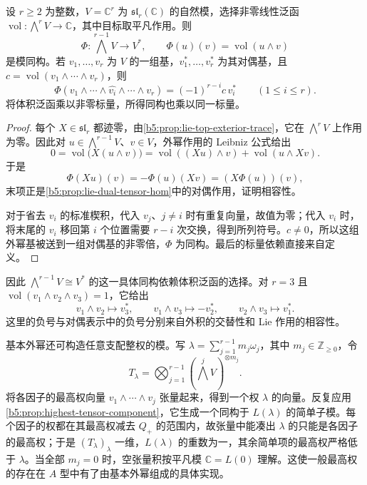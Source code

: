 \begin{proposition}[体积泛函与外幂对偶]\label{b5:prop:volume-exterior-dual}
	设 \(r\ge2\) 为整数，\(V=\mathbb C^r\) 为 \(\mathfrak{sl}_r(\mathbb C)\) 的自然模，选择非零线性泛函 \(\operatorname{vol}:\bigwedge^rV\to\mathbb C\)，其中目标取平凡作用。则
	\[
		\Phi:\bigwedge^{r-1}V\longrightarrow V^*,\qquad \Phi(u)(v)=\operatorname{vol}(u\wedge v)
	\]
	是模同构。若 \(v_1,\ldots,v_r\) 为 \(V\) 的一组基，\(v_1^*,\ldots,v_r^*\) 为其对偶基，且 \(c=\operatorname{vol}(v_1\wedge\cdots\wedge v_r)\)，则
	\[
		\Phi(v_1\wedge\cdots\wedge\widehat{v_i}\wedge\cdots\wedge v_r) =(-1)^{r-i}c\,v_i^*\qquad(1\le i\le r).
	\]
	将体积泛函乘以非零标量，所得同构也乘以同一标量。
\end{proposition}
\begin{proof}
	每个 \(X\in\mathfrak{sl}_r\) 都迹零，由\cref{b5:prop:lie-top-exterior-trace}，它在 \(\bigwedge^rV\) 上作用为零。因此对 \(u\in\bigwedge^{r-1}V\)、\(v\in V\)，外幂作用的 Leibniz 公式给出
	\[
		0=\operatorname{vol}\bigl(X(u\wedge v)\bigr) =\operatorname{vol}((Xu)\wedge v)+\operatorname{vol}(u\wedge Xv).
	\]
	于是
	\[
		\Phi(Xu)(v)=-\Phi(u)(Xv)=(X\Phi(u))(v),
	\]
	末项正是\cref{b5:prop:lie-dual-tensor-hom}中的对偶作用，证明相容性。

	对于省去 \(v_i\) 的标准楔积，代入 \(v_j\)、\(j\ne i\) 时有重复向量，故值为零；代入 \(v_i\) 时，将末尾的 \(v_i\) 移回第 \(i\) 个位置需要 \(r-i\) 次交换，得到所列符号。\(c\ne0\)，所以这组外幂基被送到一组对偶基的非零倍，\(\Phi\) 为同构。最后的标量依赖直接来自定义。
\end{proof}

因此 \(\bigwedge^{r-1}V\cong V^*\) 的这一具体同构依赖体积泛函的选择。对 \(r=3\) 且 \(\operatorname{vol}(v_1\wedge v_2\wedge v_3)=1\)，它给出
\[
	v_1\wedge v_2\longmapsto v_3^*,\qquad v_1\wedge v_3\longmapsto-v_2^*,\qquad v_2\wedge v_3\longmapsto v_1^*.
\]
这里的负号与对偶表示中的负号分别来自外积的交替性和 Lie 作用的相容性。

\ProseParagraphBreak
基本外幂还可构造任意支配整权的模。写 \(\lambda=\sum_{j=1}^{r-1}m_j\omega_j\)，其中 \(m_j\in\mathbb Z_{\ge0}\)，令
\[
	T_\lambda=\bigotimes_{j=1}^{r-1}\left(\bigwedge^jV\right)^{\otimes m_j}.
\]
将各因子的最高权向量 \(v_1\wedge\cdots\wedge v_j\) 张量起来，得到一个权 \(\lambda\) 的向量。反复应用\cref{b5:prop:highest-tensor-component}，它生成一个同构于 \(L(\lambda)\) 的简单子模。每个因子的权都在其最高权减去 \(Q_+\) 的范围内，故张量中能凑出 \(\lambda\) 的只能是各因子的最高权；于是 \((T_\lambda)_\lambda\) 一维，\(L(\lambda)\) 的重数为一，其余简单项的最高权严格低于 \(\lambda\)。当全部 \(m_j=0\) 时，空张量积按平凡模 \(\mathbb C=L(0)\) 理解。这使一般最高权的存在在 \(A\) 型中有了由基本外幂组成的具体实现。


